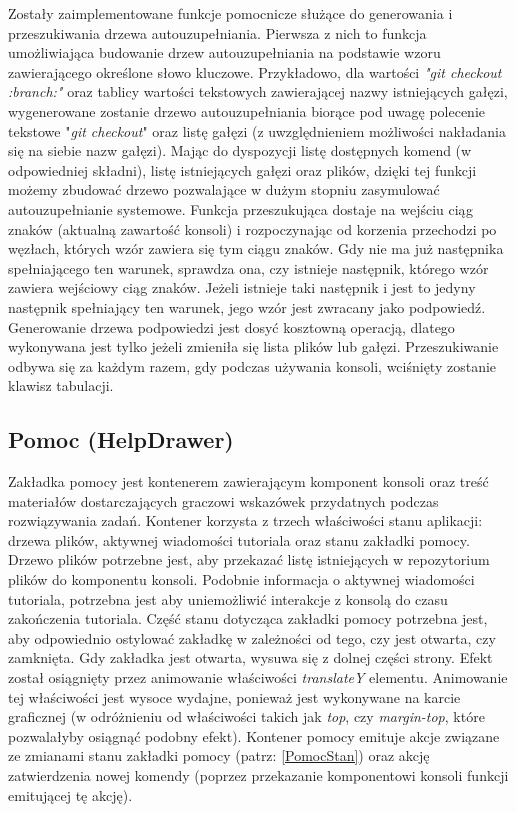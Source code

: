 \documentclass[12pt,a4paper,polish,thesis]{dcsbook}
\begin{document}
{	Zostały zaimplementowane funkcje pomocnicze służące do generowania i przeszukiwania drzewa autouzupełniania. Pierwsza z nich to funkcja umożliwiająca budowanie drzew autouzupełniania na podstawie wzoru zawierającego określone słowo kluczowe. Przykładowo, dla wartości \textit{"git checkout :branch:"} oraz tablicy wartości tekstowych zawierającej nazwy istniejących gałęzi, wygenerowane zostanie drzewo autouzupełniania biorące pod uwagę polecenie tekstowe "\textit{git checkout}" oraz listę gałęzi (z uwzględnieniem możliwości nakładania się na siebie nazw gałęzi). Mając do dyspozycji listę dostępnych komend (w odpowiedniej składni), listę istniejących gałęzi oraz plików, dzięki tej funkcji możemy zbudować drzewo pozwalające w dużym stopniu zasymulować autouzupełnianie systemowe. Funkcja przeszukująca dostaje na wejściu ciąg znaków (aktualną zawartość konsoli) i rozpoczynając od korzenia przechodzi po węzłach, których wzór zawiera się tym ciągu znaków. Gdy nie ma już następnika spełniającego ten warunek, sprawdza ona, czy istnieje następnik, którego wzór zawiera wejściowy ciąg znaków. Jeżeli istnieje taki następnik i jest to jedyny następnik spełniający ten warunek, jego wzór jest zwracany jako podpowiedź.
	Generowanie drzewa podpowiedzi jest dosyć kosztowną operacją, dlatego wykonywana jest tylko jeżeli zmieniła się lista plików lub gałęzi. Przeszukiwanie odbywa się za każdym razem, gdy podczas używania konsoli, wciśnięty zostanie klawisz tabulacji.

	\subsection{Pomoc (HelpDrawer)}

	Zakładka pomocy jest kontenerem zawierającym komponent konsoli oraz treść materiałów dostarczających graczowi wskazówek przydatnych podczas rozwiązywania zadań. Kontener korzysta z trzech właściwości stanu aplikacji: drzewa plików, aktywnej wiadomości tutoriala oraz stanu zakładki pomocy. Drzewo plików potrzebne jest, aby przekazać listę istniejących w repozytorium plików do komponentu konsoli. Podobnie informacja o aktywnej wiadomości tutoriala, potrzebna jest aby uniemożliwić interakcje z konsolą do czasu zakończenia tutoriala. Część stanu dotycząca zakładki pomocy potrzebna jest, aby odpowiednio ostylować zakładkę w zależności od tego, czy jest otwarta, czy zamknięta. Gdy zakładka jest otwarta, wysuwa się z dolnej części strony. Efekt został osiągnięty przez animowanie właściwości \textit{translateY} elementu. Animowanie tej właściwości jest wysoce wydajne, ponieważ jest wykonywane na karcie graficznej (w odróżnieniu od właściwości takich jak \textit{top}, czy \textit{margin-top}, które pozwalałyby osiągnąć podobny efekt). Kontener pomocy emituje akcje związane ze zmianami stanu zakładki pomocy (patrz: \ref{PomocStan}) oraz akcję zatwierdzenia nowej komendy (poprzez przekazanie komponentowi konsoli funkcji emitującej tę akcję).

}
\end{document}

